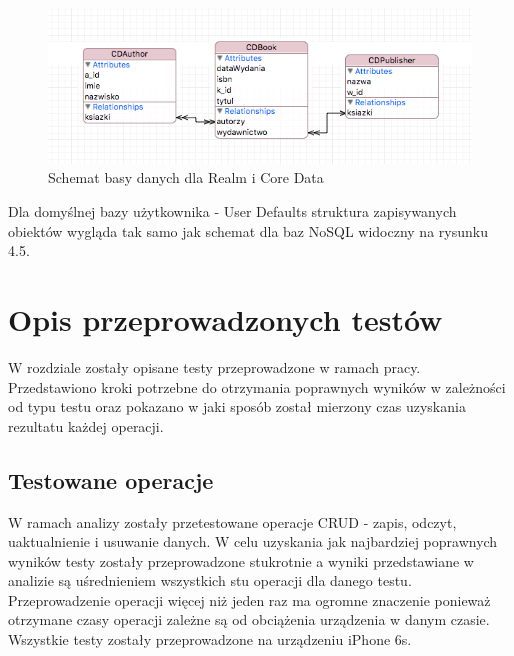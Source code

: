 \begin{figure}[h]
\centering
	\includegraphics[width=\linewidth]{img/database/document-sheme.png}
	\caption{Schemat basy danych dla Realm i Core Data}
	\label{fig: nosql_data_scheme}
\end{figure}

Dla domyślnej bazy użytkownika - User Defaults struktura zapisywanych obiektów wygląda tak samo jak schemat dla baz NoSQL widoczny na rysunku 4.5. \par 

\section{Opis przeprowadzonych testów}

W rozdziale zostały opisane testy przeprowadzone w ramach pracy. Przedstawiono kroki potrzebne do otrzymania poprawnych wyników w zależności od typu testu oraz pokazano w jaki sposób został mierzony czas uzyskania rezultatu każdej operacji. 

\subsection{Testowane operacje}

W ramach analizy zostały przetestowane operacje CRUD - zapis, odczyt, uaktualnienie i usuwanie danych. W celu uzyskania jak najbardziej poprawnych wyników testy zostały przeprowadzone stukrotnie a wyniki przedstawiane w analizie są uśrednieniem wszystkich stu operacji dla danego testu. Przeprowadzenie operacji więcej niż jeden raz ma ogromne znaczenie ponieważ otrzymane czasy operacji zależne są od obciążenia urządzenia w danym czasie. Wszystkie testy zostały przeprowadzone na  urządzeniu iPhone 6s. \par

